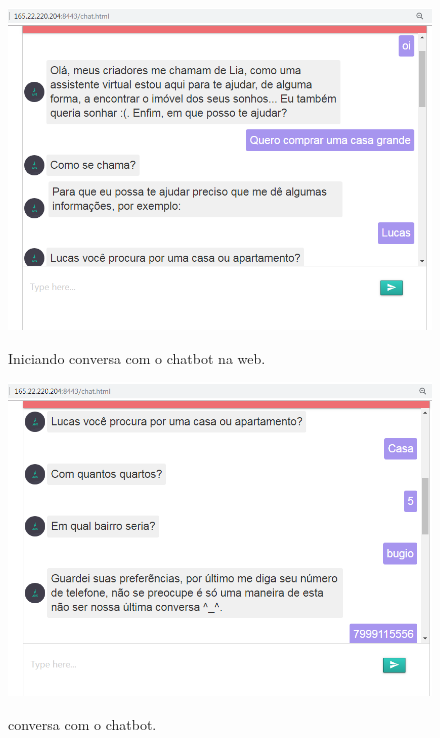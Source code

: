 \begin{figure}[H]
  \centering
   \caption{Iniciando conversa com o chatbot na web.}
  \includegraphics[scale=0.5]{Imagens/chat1.PNG} 
  \label{twilio-webhook-code}
\end{figure}

\begin{figure}[H]
  \centering
   \caption{conversa com o chatbot.}
  \includegraphics[scale=0.5]{Imagens/chat2.PNG} 
  \label{twilio-webhook-code}
\end{figure}


